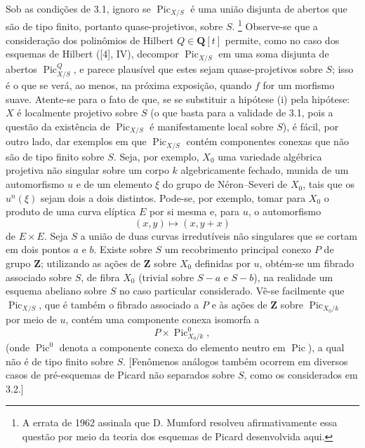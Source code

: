 Sob as condições de 3.1, ignoro se
$\operatorname{Pic}_{X/S}$ é uma união disjunta de abertos que são de tipo
finito, portanto quase-projetivos, sobre $S$.
\footnote{A errata de 1962 assinala que D. Mumford resolveu afirmativamente essa
questão por meio da teoria dos esquemas de Picard desenvolvida aqui.} Observe-se
que a consideração dos polinômios de Hilbert $Q\in\mathbf Q[t]$ permite, como no
caso dos esquemas de Hilbert ([4], IV), decompor
$\operatorname{Pic}_{X/S}$ em uma soma disjunta de abertos
$\operatorname{Pic}^{Q}_{X/S}$, e parece plausível que estes sejam
quase-projetivos sobre $S$; isso é o que se verá, ao menos, na próxima exposição,
quando $f$ for um morfismo suave. Atente-se para o fato de que, se se substituir
a hipótese (i) pela hipótese: $X$ é localmente projetivo sobre $S$ (o que basta
para a validade de 3.1, pois a questão da existência de
$\operatorname{Pic}_{X/S}$ é manifestamente local sobre $S$), é fácil, por
outro lado,
dar exemplos em que $\operatorname{Pic}_{X/S}$ contém componentes conexas que
não são de tipo finito sobre $S$. Seja, por exemplo, $X_0$ uma variedade
algébrica projetiva não singular sobre um corpo $k$ algebricamente fechado,
munida de um automorfismo $u$ e de um elemento $\xi$ do grupo de
Néron--Severi de $X_0$, tais que os $u^n(\xi)$ sejam dois a dois distintos.
Pode-se, por exemplo, tomar para $X_0$ o produto de uma curva elíptica $E$ por
si mesma e, para $u$, o automorfismo
\[
(x,y)\longmapsto(x,y+x)
\]
de $E\times E$. Seja $S$ a união de duas curvas irredutíveis não singulares que
se cortam em dois pontos $a$ e $b$. Existe sobre $S$ um recobrimento principal
conexo $P$ de grupo $\mathbf Z$; utilizando as ações de $\mathbf Z$ sobre $X_0$
definidas por $u$, obtém-se um fibrado associado sobre $S$, de fibra $X_0$
(trivial sobre $S-a$ e $S-b$), na realidade um esquema abeliano sobre $S$ no
caso particular considerado. Vê-se facilmente que
$\operatorname{Pic}_{X/S}$, que é também o fibrado associado a $P$ e às ações
de $\mathbf Z$ sobre $\operatorname{Pic}_{X_0/k}$ por meio de $u$, contém uma
componente conexa isomorfa a
\[
P\times\operatorname{Pic}^{0}_{X_0/k},
\]
(onde $\operatorname{Pic}^{0}$ denota a componente conexa do elemento neutro
em $\operatorname{Pic}$), a qual não é de tipo finito sobre $S$. [Fenômenos
análogos também ocorrem em diversos casos de pré-esquemas de Picard não
separados sobre $S$, como os considerados em 3.2.]


